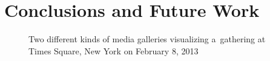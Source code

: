 \documentclass{sig-alternate}
\begin{document}
\section{Conclusions and Future Work}

\begin{figure}[t!]
  \centering
  \caption{Two different kinds of media galleries visualizing a~gathering at Times Square, New York on February 8, 2013}
  \label{fig:m}  
\end{figure}





\end{document}
